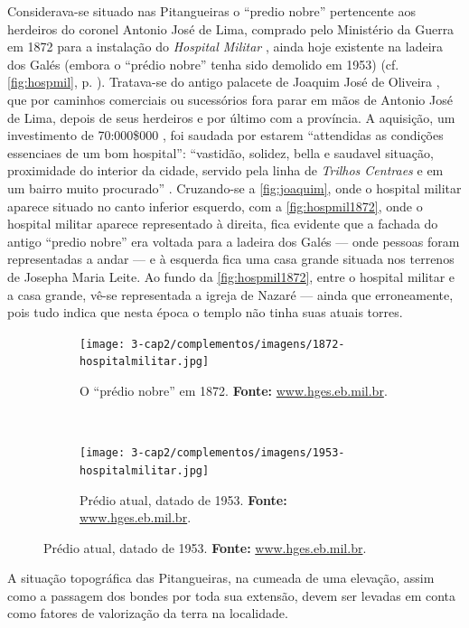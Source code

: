 Considerava-se situado nas Pitangueiras o ``predio nobre'' pertencente aos herdeiros do coronel Antonio José de Lima, comprado pelo Ministério da Guerra em 1872 para a instalação do \textit{Hospital Militar} \cite[p.~30]{bahia_1872}, ainda hoje existente na ladeira dos Galés (embora o ``prédio nobre'' tenha sido demolido em 1953) (cf. \autoref{fig:hospmil}, p. \pageref{fig:hospmil}). Tratava-se do antigo palacete de Joaquim José de Oliveira \cite[p.~36]{bahia_rpe_1874}, que por caminhos comerciais ou sucessórios fora parar em mãos de Antonio José de Lima, depois de seus herdeiros e por último com a província. A aquisição, um investimento de 70:000\$000 \cite[p.~10]{bahia_1872}, foi saudada por estarem ``attendidas as condições essenciaes de um bom hospital'': ``vastidão, solidez, bella e saudavel situação, proximidade do interior da cidade, servido pela linha de \textit{Trilhos Centraes} e em um bairro muito procurado'' \cite[p.~31]{bahia_1872}. Cruzando-se a \autoref{fig:joaquim}, onde o hospital militar aparece situado no canto inferior esquerdo, com a \autoref{fig:hospmil1872}, onde o hospital militar aparece representado à direita, fica evidente que a fachada do antigo ``predio nobre'' era voltada para a ladeira dos Galés --- onde pessoas foram representadas a andar --- e à esquerda fica uma casa grande situada nos terrenos de Josepha Maria Leite. Ao fundo da \autoref{fig:hospmil1872}, entre o hospital militar e a casa grande, vê-se representada a igreja de Nazaré --- ainda que erroneamente, pois tudo indica que nesta época o templo não tinha suas atuais torres.

\begin{figure}[!htp]
	\caption{Hospital Militar de Salvador em dois tempos}
	\centering
		\begin{subfigure}[b]{\textwidth}
			\texttt{[image: 3-cap2/complementos/imagens/1872-hospitalmilitar.jpg]}
			\caption{\footnotesize O ``prédio nobre'' em 1872. \textbf{Fonte:} \url{www.hges.eb.mil.br}. }
			\label{fig:hospmil1872}
		\end{subfigure}
\  %
		\begin{subfigure}[b]{\textwidth}
			\texttt{[image: 3-cap2/complementos/imagens/1953-hospitalmilitar.jpg]} 
			\caption{\footnotesize Prédio atual, datado de 1953. \textbf{Fonte:} \url{www.hges.eb.mil.br}. }
			\label{fig:hospmil1953}
		\end{subfigure}
	\label{fig:hospmil}
\end{figure}

A situação topográfica das Pitangueiras, na cumeada de uma elevação, assim como a passagem dos bondes por toda sua extensão, devem ser levadas em conta como fatores de valorização da terra na localidade.

